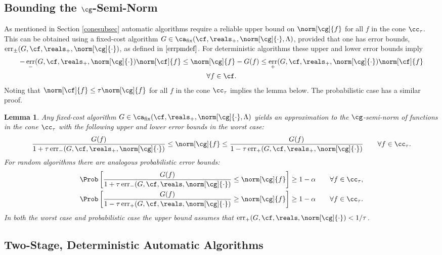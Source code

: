 \documentclass[final]{elsarticle}
\DeclareMathOperator{\err}{err}
\newtheorem{lem}[theorem]{Lemma}
\theoremstyle{definition}
\theoremstyle{remark}
\DeclareMathOperator{\fix}{fix}
\begin{document}
\subsection{Bounding the $\cg$-Semi-Norm}

As mentioned in Section \ref{conesubsec} automatic algorithms require a reliable upper bound on $\norm[\cg]{f}$ for all $f$ in the cone $\cc_{\tau}$. This can be obtained using a fixed-cost algorithm $G \in \ca_{\fix}(\cf,\reals_+,\norm[\cg]{\cdot},\Lambda)$, provided that one has error bounds, $\err_{\pm}(G,\cf,\reals_+,\norm[\cg]{\cdot})$, as defined in $\eqref{errpmdef}$.  For deterministic algorithms these upper and lower error bounds imply 
\begin{multline*}
-\err_{-}(G,\cf,\reals_{+},\norm[\cg]{\cdot}) \norm[\cf]{f} \le \norm[\cg]{f}-G(f) \le \err_{+}(G,\cf,\reals_{+},\norm[\cg]{\cdot}) \norm[\cf]{f} \\ \forall f \in \cf.
\end{multline*}
Noting that $\norm[\cf]{f} \le \tau \norm[\cg]{f}$ for all $f$ in the cone $\cc_{\tau}$ implies the lemma below.  The probabilistic case has a similar proof.

\begin{lem} \label{Gnormlem} Any fixed-cost algorithm $G \in \ca_{\fix}(\cf,\reals_+,\norm[\cg]{\cdot},\Lambda)$ yields an approximation to the $\cg$-semi-norm of functions in the cone $\cc_{\tau}$ with the following upper and lower error bounds in the worst case:
\begin{equation*}
\frac{G(f)}{1 + \tau \err_{-}(G,\cf,\reals_+,\norm[\cg]{\cdot})} \le \norm[\cg]{f} \le \frac{G(f)}{1 - \tau \err_{+}(G,\cf,\reals_+,\norm[\cg]{\cdot})} \qquad \forall f \in \cc_{\tau}.
\end{equation*}
For random algorithms there are analogous probabilistic error bounds:
\begin{gather*}
\Prob\left[\frac{G(f)}{1 + \tau \err_{-}(G,\cf,\reals,\norm[\cg]{\cdot})} \le \norm[\cg]{f} \right] \ge 1 - \alpha \qquad \forall f \in \cc_{\tau}, \\
\Prob\left[\frac{G(f)}{1 - \tau \err_{+}(G,\cf,\reals,\norm[\cg]{\cdot})} \ge \norm[\cg]{f} \right] \ge 1 - \alpha \qquad \forall f \in \cc_{\tau}.
\end{gather*}
In both the worst case and probabilistic case the upper bound assumes that  $\err_{+}(G,\cf,\reals,\norm[\cg]{\cdot}) < 1/\tau$.
\end{lem}

\subsection{Two-Stage, Deterministic Automatic Algorithms}
\end{document}
